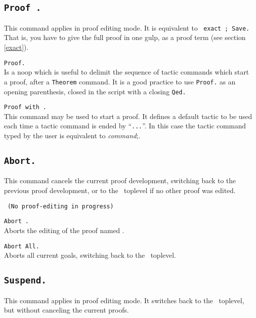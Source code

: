 \subsection{\tt Proof {\term}.}
This command applies in proof editing mode. It is equivalent to {\tt
  exact {\term}; Save.} That is, you have to give the full proof in
one gulp, as a proof term (see section \ref{exact}).

\begin{Variants}
\item{\tt Proof.}\\
Is a noop which is useful to delimit the sequence of
tactic commands which start a proof, after a {\tt Theorem} command.
It is a good practice to use {\tt Proof.} as an opening parenthesis,
closed in the script with a closing {\tt Qed.}
\item{\tt Proof with {\tac}.}\\
This command may be used to start a proof. It defines a default tactic to be used each time a tactic command is ended by ``\verb#...#''. In this case the tactic command typed by the user is equivalent to \emph{command};{\tac}.  

\end{Variants}

\subsection{\tt Abort.}
This command cancels the current proof development, switching back to
the previous proof development, or to the \Coq\ toplevel if no other
proof was edited.

\begin{ErrMsgs}
\item {}\texttt{ (No proof-editing in progress)}
\end{ErrMsgs}

\begin{Variants}
\item {\tt Abort {\ident}.}\\
  Aborts the editing of the proof named {\ident}.
\item {\tt Abort All.}\\
  Aborts all current goals, switching back to the \Coq\ toplevel.
\end{Variants}

\subsection{\tt Suspend.}
This command applies in proof editing mode. It switches back to the
\Coq\ toplevel, but without canceling the current proofs.

